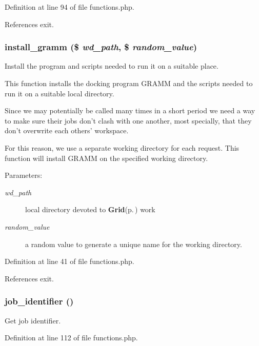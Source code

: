 Definition at line 94 of file functions.php.

References exit.
\subsubsection{\setlength{\rightskip}{0pt plus 5cm}install\_\-gramm (\$ {\em wd\_\-path}, \$ {\em random\_\-value})}\label{functions_8php_a0}


Install the program and scripts needed to run it on a suitable place. 

This function installs the docking program GRAMM and the scripts needed to run it on a suitable local directory.

Since we may potentially be called many times in a short period we need a way to make sure their jobs don't clash with one another, most specially, that they don't overwrite each others' workspace.

For this reason, we use a separate working directory for each request. This function will install GRAMM on the specified working directory.

\begin{Desc}
\item[Parameters:]
\begin{description}
\item[{\em wd\_\-path}]local directory devoted to {\bf Grid}{\rm (p.\,\pageref{classGrid})} work \item[{\em random\_\-value}]a random value to generate a unique name for the working directory. \end{description}
\end{Desc}


Definition at line 41 of file functions.php.

References exit.
\subsubsection{\setlength{\rightskip}{0pt plus 5cm}job\_\-identifier ()}\label{functions_8php_a2}


Get job identifier. 



Definition at line 112 of file functions.php.
